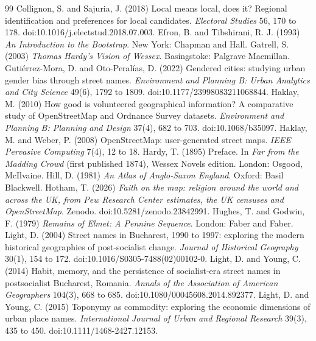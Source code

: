 \documentclass[11pt,a4paper]{article}
\begin{document}
\begin{thebibliography}{99}
 Collignon, S. and Sajuria, J. (2018) Local means local, does it? Regional identification and preferences for local candidates. \textit{Electoral Studies} 56, 170 to 178. doi:10.1016/j.electstud.2018.07.003.
 Efron, B. and Tibshirani, R. J. (1993) \textit{An Introduction to the Bootstrap}. New York: Chapman and Hall.
 Gatrell, S. (2003) \textit{Thomas Hardy's Vision of Wessex}. Basingstoke: Palgrave Macmillan.
 Gutiérrez-Mora, D. and Oto-Peralías, D. (2022) Gendered cities: studying urban gender bias through street names. \textit{Environment and Planning B: Urban Analytics and City Science} 49(6), 1792 to 1809. doi:10.1177/23998083211068844.
 Haklay, M. (2010) How good is volunteered geographical information? A comparative study of OpenStreetMap and Ordnance Survey datasets. \textit{Environment and Planning B: Planning and Design} 37(4), 682 to 703. doi:10.1068/b35097.
 Haklay, M. and Weber, P. (2008) OpenStreetMap: user-generated street maps. \textit{IEEE Pervasive Computing} 7(4), 12 to 18.
 Hardy, T. (1895) Preface. In \textit{Far from the Madding Crowd} (first published 1874), Wessex Novels edition. London: Osgood, McIlvaine.
 Hill, D. (1981) \textit{An Atlas of Anglo-Saxon England}. Oxford: Basil Blackwell.
 Hotham, T. (2026) \textit{Faith on the map: religion around the world and across the UK, from Pew Research Center estimates, the UK censuses and OpenStreetMap}. Zenodo. doi:10.5281/zenodo.23842991.
 Hughes, T. and Godwin, F. (1979) \textit{Remains of Elmet: A Pennine Sequence}. London: Faber and Faber.
 Light, D. (2004) Street names in Bucharest, 1990 to 1997: exploring the modern historical geographies of post-socialist change. \textit{Journal of Historical Geography} 30(1), 154 to 172. doi:10.1016/S0305-7488(02)00102-0.
 Light, D. and Young, C. (2014) Habit, memory, and the persistence of socialist-era street names in postsocialist Bucharest, Romania. \textit{Annals of the Association of American Geographers} 104(3), 668 to 685. doi:10.1080/00045608.2014.892377.
 Light, D. and Young, C. (2015) Toponymy as commodity: exploring the economic dimensions of urban place names. \textit{International Journal of Urban and Regional Research} 39(3), 435 to 450. doi:10.1111/1468-2427.12153.

\end{thebibliography}
\end{document}
